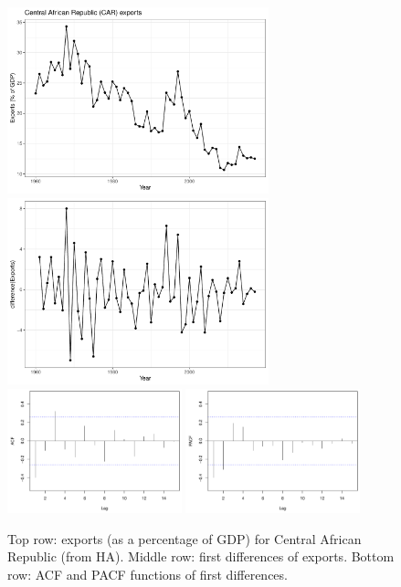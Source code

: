 \documentclass{article}
\begin{document}
\begin{itemize}
\begin{figure}[p]
\centering
\includegraphics[width=0.675\textwidth]{fig/car-1.pdf}
\includegraphics[width=0.675\textwidth]{fig/car-2.pdf}
\includegraphics[width=0.45\textwidth]{fig/car-3.pdf}
\includegraphics[width=0.45\textwidth]{fig/car-4.pdf}
\caption{Top row: exports (as a percentage of GDP) for Central African
  Republic (from HA). Middle row: first differences of exports. Bottom row: ACF 
  and PACF functions of first differences.}
\label{fig:car-exploratory}
\end{figure}


\end{itemize}
\end{document}
